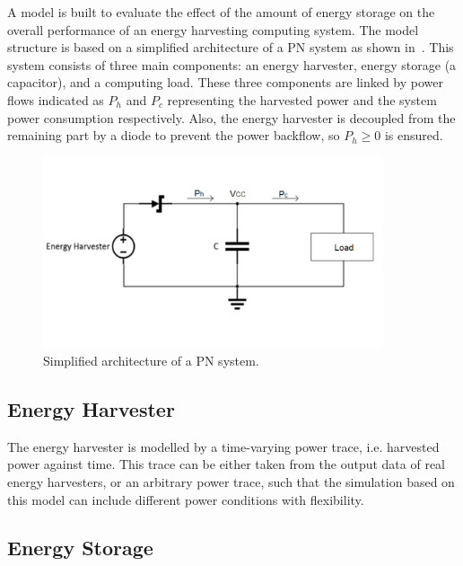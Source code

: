 A model is built to evaluate the effect of the amount of energy storage on the overall performance of an energy harvesting computing system. The model structure is based on a simplified architecture of a PN system as shown in~. This system consists of three main components: an energy harvester, energy storage (a capacitor), and a computing load. These three components are linked by power flows indicated as $P_h$ and $P_c$ representing the harvested power and the system power consumption respectively. Also, the energy harvester is decoupled from the remaining part by a diode to prevent the power backflow, so $P_h \geq 0$ is ensured.

\begin{figure} [!tb]
    \centering
    \includegraphics[width=10cm]{figure/work2/modelarch}
    \caption{Simplified architecture of a PN system.}
    \label{Figure:modelarch}
\end{figure} 

\subsection{Energy Harvester}

The energy harvester is modelled by a time-varying power trace, i.e. harvested power against time. This trace can be either taken from the output data of real energy harvesters, or an arbitrary power trace, such that the simulation based on this model can include different power conditions with flexibility. 

\subsection{Energy Storage}

